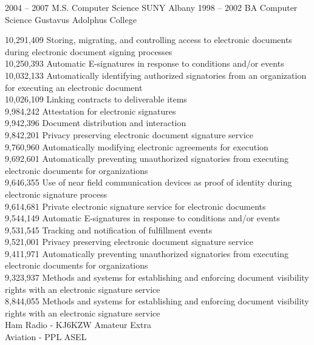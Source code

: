 \documentclass[9pt]{developercv} %
\begin{document}

\begin{entrylist}
	\entry
		{2004 -- 2007}
		{M.S. Computer Science}
	        {SUNY Albany}
                {}
	\entry
		{1998 -- 2002}
		{BA Computer Science}
	        {Gustavus Adolphus College}
                {}
\end{entrylist}


10,291,409      Storing, migrating, and controlling access to electronic documents during electronic document signing processes \\
10,250,393      Automatic E-signatures in response to conditions and/or events \\
10,032,133 	Automatically identifying authorized signatories from an organization for executing an electronic document \\
10,026,109	Linking contracts to deliverable items \\
9,984,242	Attestation for electronic signatures \\
9,942,396	Document distribution and interaction \\
9,842,201	Privacy preserving electronic document signature service \\
9,760,960	Automatically modifying electronic agreements for execution \\
9,692,601	Automatically preventing unauthorized signatories from executing electronic documents for organizations \\
9,646,355	Use of near field communication devices as proof of identity during electronic signature process \\
9,614,681	Private electronic signature service for electronic documents \\
9,544,149	Automatic E-signatures in response to conditions and/or events \\ 
9,531,545	Tracking and notification of fulfillment events \\
9,521,001	Privacy preserving electronic document signature service \\
9,411,971	Automatically preventing unauthorized signatories from executing electronic documents for organizations \\
9,323,937	Methods and systems for establishing and enforcing document visibility rights with an electronic signature service \\
8,844,055	Methods and systems for establishing and enforcing document visibility rights with an electronic signature service \\

Ham Radio - KJ6KZW Amateur Extra \\
Aviation - PPL ASEL \\


\end{document}
